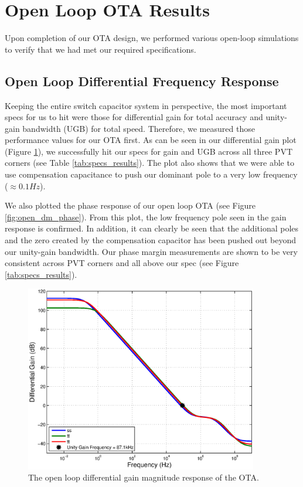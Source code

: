 \documentclass[journal]{IEEEtran}
\begin{document}
\section{Open Loop OTA Results}
Upon completion of our OTA design, we performed various open-loop simulations to verify that we had met our required specifications.

\subsection{Open Loop Differential Frequency Response}
Keeping the entire switch capacitor system in perspective, the most important specs for us to hit were those for differential gain for total accuracy and unity-gain bandwidth (UGB) for total speed. Therefore, we measured those performance values for our OTA first. As can be seen in our differential gain plot (Figure \ref{fig:open_dm_gain}), we successfully hit our specs for gain and UGB across all three PVT corners (see Table \ref{tab:specs_results}). The plot also shows that we were able to use compensation capacitance to push our dominant pole to a very low frequency ($\approx0.1 Hz$).

We also plotted the phase response of our open loop OTA (see Figure \ref{fig:open_dm_phase}). From this plot, the low frequency pole seen in the gain response is confirmed. In addition, it can clearly be seen that the additional poles and the zero created by the compensation capacitor has been pushed out beyond our unity-gain bandwidth. Our phase margin measurements are shown to be very consistent across PVT corners and all above our spec (see Figure \ref{tab:specs_results}).

\begin{figure}
\centering
\includegraphics[width=4in]{Plots/open_dm_gain.eps}
\caption{The open loop differential gain magnitude response of the OTA.}
\label{fig:open_dm_gain}
\end{figure}
\end{document}
